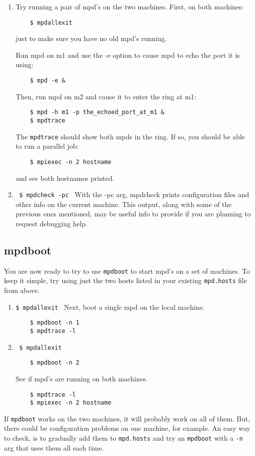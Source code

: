 \documentclass[dvipdfm,11pt]{article}
\begin{document}
\begin{enumerate}
\item Try running a pair of mpd's on the two machines.  First, on both
  machines:
\begin{verbatim}
    $ mpdallexit
\end{verbatim}
just to make sure you have no old mpd's running.

Run mpd on m1 and use the -e option to cause mpd to echo
the port it is using:
\begin{verbatim}
    $ mpd -e &        
\end{verbatim}
    Then, run mpd on m2 and cause it to enter the ring at m1:
\begin{verbatim}
    $ mpd -h m1 -p the_echoed_port_at_m1 &
    $ mpdtrace
\end{verbatim}
The \texttt{mpdtrace} should show both mpds in the ring.  If so,
you should be able to run a parallel job:
\begin{verbatim}
    $ mpiexec -n 2 hostname        
\end{verbatim}
and see both hostnames printed.

\item \verb+ $ mpdcheck -pc +
With the -pc arg, mpdcheck prints configuration files and other
info on the current machine.  This output, along with some of the previous
ones mentioned, may be useful info to provide if you are planning to request
debugging help.

\end{enumerate}


\subsection{mpdboot}
\label{sec:mpdboot}

You are now ready to try to use \texttt{mpdboot} to start mpd's on a
set of machines.  To keep it simple, try using just the two
hosts listed in your existing \texttt{mpd.hosts} file from above.

\begin{enumerate}

\item  \verb+$ mpdallexit +
Next, boot a single mpd on the local machine.
\begin{verbatim}
    $ mpdboot -n 1
    $ mpdtrace -l
\end{verbatim}

\item \verb+ $ mpdallexit +
\begin{verbatim}
    $ mpdboot -n 2    
\end{verbatim}
See if mpd's are running on both machines.
\begin{verbatim}
    $ mpdtrace -l
    $ mpiexec -n 2 hostname
\end{verbatim}

\end{enumerate}

If \texttt{mpdboot} works on the two machines, it will probably work on
all of them.  But, there could be configuration problems on one machine,
for example.  An easy way to check, is to gradually add them to
\texttt{mpd.hosts} and try an \texttt{mpdboot} with a \texttt{-n} arg
that uses them all each time.
\end{document}
